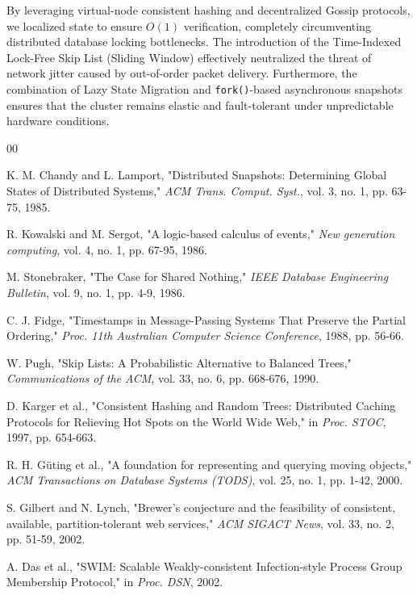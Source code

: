 \documentclass[conference]{IEEEtran}
\begin{document}
By leveraging virtual-node consistent hashing and decentralized Gossip protocols, we localized state to ensure $O(1)$ verification, completely circumventing distributed database locking bottlenecks. The introduction of the Time-Indexed Lock-Free Skip List (Sliding Window) effectively neutralized the threat of network jitter caused by out-of-order packet delivery. Furthermore, the combination of Lazy State Migration and \texttt{fork()}-based asynchronous snapshots ensures that the cluster remains elastic and fault-tolerant under unpredictable hardware conditions.

\begin{thebibliography}{00}

 K. M. Chandy and L. Lamport, "Distributed Snapshots: Determining Global States of Distributed Systems," \textit{ACM Trans. Comput. Syst.}, vol. 3, no. 1, pp. 63-75, 1985.

 R. Kowalski and M. Sergot, "A logic-based calculus of events," \textit{New generation computing}, vol. 4, no. 1, pp. 67-95, 1986.

 M. Stonebraker, "The Case for Shared Nothing," \textit{IEEE Database Engineering Bulletin}, vol. 9, no. 1, pp. 4-9, 1986.

 C. J. Fidge, "Timestamps in Message-Passing Systems That Preserve the Partial Ordering," \textit{Proc. 11th Australian Computer Science Conference}, 1988, pp. 56-66.

 W. Pugh, "Skip Lists: A Probabilistic Alternative to Balanced Trees," \textit{Communications of the ACM}, vol. 33, no. 6, pp. 668-676, 1990.

 D. Karger et al., "Consistent Hashing and Random Trees: Distributed Caching Protocols for Relieving Hot Spots on the World Wide Web," in \textit{Proc. STOC}, 1997, pp. 654-663.

 R. H. Güting et al., "A foundation for representing and querying moving objects," \textit{ACM Transactions on Database Systems (TODS)}, vol. 25, no. 1, pp. 1-42, 2000.

 S. Gilbert and N. Lynch, "Brewer's conjecture and the feasibility of consistent, available, partition-tolerant web services," \textit{ACM SIGACT News}, vol. 33, no. 2, pp. 51-59, 2002.

 A. Das et al., "SWIM: Scalable Weakly-consistent Infection-style Process Group Membership Protocol," in \textit{Proc. DSN}, 2002.


\end{thebibliography}
\end{document}
